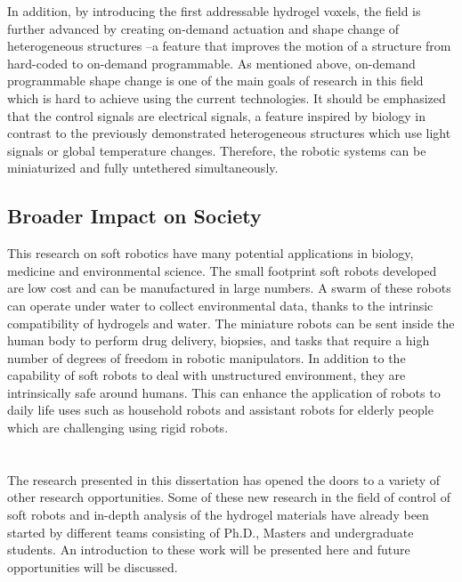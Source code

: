 In addition, by introducing the first addressable hydrogel voxels,  the field is further advanced by creating on-demand actuation and shape change of heterogeneous structures --a feature that improves the motion of a structure from hard-coded to on-demand programmable. As mentioned above, on-demand programmable shape change is one of the main goals of research in this field which is hard to achieve using the current technologies. It should be emphasized that the control signals are electrical signals, a feature inspired by biology in contrast to the previously demonstrated heterogeneous structures which use light signals or global temperature changes. Therefore, the robotic systems can be miniaturized and fully untethered simultaneously.
\subsection{Broader Impact on Society}
This research on soft robotics have many potential applications in biology, medicine and environmental science. The small footprint soft robots developed are low cost and can be manufactured in large numbers. A swarm of these robots can operate under water to collect environmental data, thanks to the intrinsic compatibility of hydrogels and water. The miniature robots can be sent inside the human body to perform drug delivery, biopsies, and tasks that require a high number of degrees of freedom in robotic manipulators.
In addition to the capability of soft robots to deal with unstructured environment, they are intrinsically safe around humans. This can enhance the application of robots to daily life uses such as household robots and assistant robots for elderly people which are challenging using rigid robots.
\section{}
The research presented in this dissertation has opened the doors to a variety of other research opportunities. Some of these new research in the field of control of soft robots and in-depth analysis of the hydrogel materials  have already been started by different teams consisting of Ph.D., Masters and undergraduate students. An introduction to these work will be presented here and future opportunities will be discussed.
